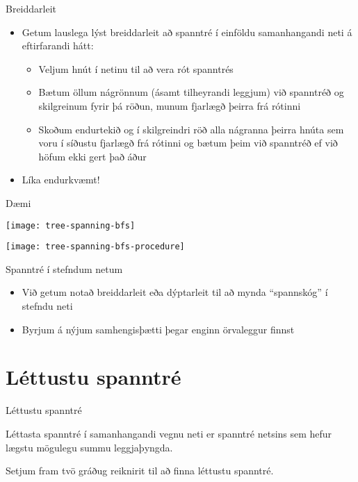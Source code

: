 \documentclass[handout]{beamer}
\begin{document}
\begin{frame}{Breiddarleit}
\begin{itemize}
 \item Getum lauslega lýst breiddarleit að spanntré í einföldu samanhangandi neti á eftirfarandi hátt:
 \begin{itemize}
  \item Veljum hnút í netinu til að vera rót spanntrés
  \item Bætum öllum nágrönnum (ásamt tilheyrandi leggjum) við spanntréð og skilgreinum fyrir þá röðun, munum fjarlægð þeirra frá rótinni
  \item Skoðum endurtekið og í skilgreindri röð alla nágranna þeirra hnúta sem voru í síðustu fjarlægð frá rótinni og bætum þeim við spanntréð ef við höfum ekki gert það áður
 \end{itemize}
 \item Líka endurkvæmt!
\end{itemize}
\end{frame}

\begin{frame}{Dæmi}
\begin{center}
\texttt{[image: tree-spanning-bfs]}

\pause
\texttt{[image: tree-spanning-bfs-procedure]}
\end{center}

\end{frame}

\begin{frame}{Spanntré í stefndum netum}
\begin{itemize}
 \item Við getum notað breiddarleit eða dýptarleit til að mynda ``spannskóg'' í stefndu neti
 \item Byrjum á nýjum samhengisþætti þegar enginn örvaleggur finnst
\end{itemize}
\end{frame}

\section{Léttustu spanntré}

\begin{frame}{Léttustu spanntré}
\begin{tcolorbox}[title=Léttustu spanntré]
Léttasta spanntré í samanhangandi vegnu neti er spanntré netsins sem hefur lægstu mögulegu summu leggjaþyngda.
\end{tcolorbox}
Setjum fram tvö gráðug reiknirit til að finna léttustu spanntré.
\end{frame}
\end{document}
